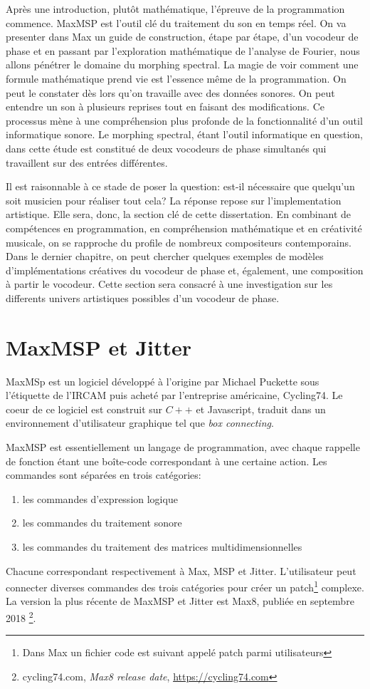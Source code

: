 Après une introduction, plutôt mathématique, l'épreuve de la programmation commence. MaxMSP est l'outil clé du traitement du son en temps réel. On va presenter dans Max un guide de construction, étape par étape, d’un vocodeur de phase et en passant par l'exploration mathématique de l'analyse de Fourier, nous allons pénétrer le domaine du morphing spectral. La magie de voir comment une formule mathématique prend vie est l'essence même de la programmation. On peut le constater dès lors qu’on travaille avec des données sonores. On peut entendre un son à plusieurs reprises tout en faisant des modifications. Ce processus mène à une compréhension plus profonde de la fonctionnalité d'un outil informatique sonore. Le morphing spectral, étant l'outil informatique en question, dans cette étude est constitué de deux vocodeurs de phase simultanés qui travaillent sur des entrées différentes.

Il est raisonnable à ce stade de poser la question: est-il nécessaire que quelqu’un soit musicien pour réaliser tout cela? La réponse repose sur l'implementation artistique. Elle sera, donc, la section clé de cette dissertation. En combinant de compétences en programmation, en compréhension mathématique et en créativité musicale, on se rapproche du profile de nombreux compositeurs contemporains. Dans le dernier chapitre, on peut chercher quelques exemples de modèles d'implémentations créatives du vocodeur de phase et, également, une composition à partir le vocodeur. Cette section sera consacré à une investigation sur les differents univers artistiques possibles d'un vocodeur de phase.

\section{MaxMSP et Jitter}

MaxMSp est un logiciel développé à l'origine par Michael Puckette sous l'étiquette de l'IRCAM puis acheté par l’entreprise américaine, Cycling74. Le coeur de ce logiciel est construit sur $C++$ et Javascript, traduit dans un environnement d’utilisateur graphique tel que \textit{box connecting}.

MaxMSP est essentiellement un langage de programmation, avec chaque rappelle de fonction étant une boîte-code correspondant à une certaine action. Les commandes sont séparées en trois catégories: 
\begin{enumerate}
	\item
	les commandes d'expression logique
	\item
	les commandes du traitement sonore
	\item
	les commandes du traitement des matrices multidimensionnelles	
\end{enumerate}
Chacune correspondant respectivement à Max, MSP et Jitter. L'utilisateur peut connecter diverses commandes des trois catégories pour créer un patch\footnote{Dans Max un fichier code est suivant appelé \guillemotleft patch \guillemotright parmi utilisateurs} complexe. La version la plus récente de MaxMSP et Jitter est Max8, publiée en septembre 2018 \footnote{cycling74.com, \textit{Max8 release date}, \href{https://cycling74.com}{https://cycling74.com} \nocite{cycling74}}.

